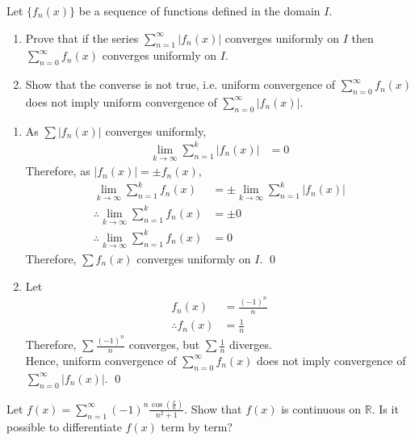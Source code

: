 \documentclass[fleqn, a4paper, 11pt, oneside]{amsart}
\theoremstyle{definition}
\theoremstyle{theorem}
\begin{document}
\begin{question}
	Let $\{f_n(x)\}$ be a sequence of functions defined in the domain $I$.
	\begin{enumerate}
		\item Prove that if the series $\sum\limits_{n = 1}^{\infty} |f_n(x)|$ converges uniformly on $I$ then $\sum\limits_{n = 0}^{\infty} f_n(x)$ converges uniformly on $I$.
		\item Show that the converse is not true, i.e. uniform convergence of $\sum\limits_{n = 0}^{\infty} f_n(x)$ does not imply uniform convergence of $\sum\limits_{n = 0}^{\infty} |f_n(x)|$.
	\end{enumerate}
\end{question}

\begin{solution}
	\begin{enumerate}
		\item
			As $\sum |f_n(x)|$ converges uniformly,
			\begin{align*}
				\lim\limits_{k \to \infty} \sum\limits_{n = 1}^{k} |f_n(x)| & = 0
			\end{align*}
			Therefore, as $|f_n(x)| = \pm f_n(x)$,
			\begin{align*}
				\lim\limits_{k \to \infty} \sum\limits_{n = 1}^{k} f_n(x)            & = \pm \lim\limits_{k \to \infty} \sum\limits_{n = 1}^{k} |f_n(x)| \\
				\therefore \lim\limits_{k \to \infty} \sum\limits_{n = 1}^{k} f_n(x) & = \pm 0                                                           \\
				\therefore \lim\limits_{k \to \infty} \sum\limits_{n = 1}^{k} f_n(x) & = 0
			\end{align*}
			Therefore, $\sum f_n(x)$ converges uniformly on $I$.
			\qed
		\item
			Let
			\begin{align*}
				f_n(x)            & = \frac{(-1)^n}{n} \\
				\therefore f_n(x) & = \frac{1}{n}
			\end{align*}
			Therefore, $\sum \frac{(-1)^n}{n}$ converges, but $\sum \frac{1}{n}$ diverges.\\
			Hence, uniform convergence of $\sum\limits_{n = 0}^{\infty} f_n(x)$ does not imply convergence of $\sum\limits_{n = 0}^{\infty} |f_n(x)|$.
			\qed
	\end{enumerate}
\end{solution}

\begin{question}
	Let $f(x) = \sum\limits_{n = 1}^{\infty} (-1)^n \frac{\cos\left( \frac{x}{n} \right)}{n^2 + 1}$.
	Show that $f(x)$ is continuous on $\mathbb{R}$.
	Is it possible to differentiate $f(x)$ term by term?
\end{question}
\end{document}
